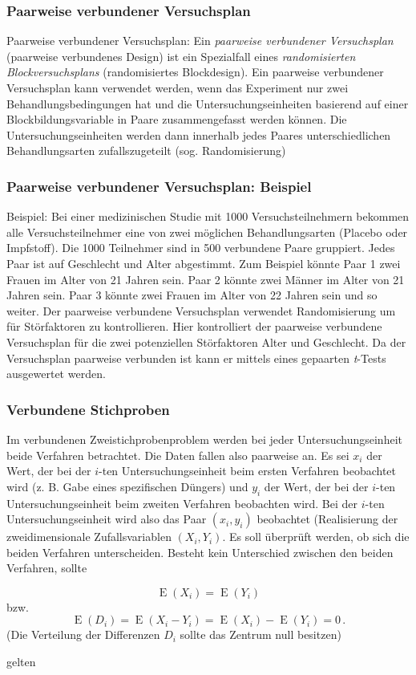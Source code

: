 \documentclass{beamer}
\begin{document}
\begin{frame}
\frametitle{Paarweise verbundener Versuchsplan}

\begin{exampleblock}{Paarweise verbundener Versuchsplan:}
Ein \textit{paarweise verbundener Versuchsplan} (paarweise verbundenes Design) ist ein Spezialfall eines \textit{randomisierten Blockversuchsplans} (randomisiertes Blockdesign). Ein paarweise verbundener Versuchsplan kann verwendet werden, wenn das Experiment nur zwei Behandlungsbedingungen hat und die Untersuchungseinheiten basierend auf einer Blockbildungsvariable in Paare zusammengefasst werden können. Die Untersuchungseinheiten werden dann innerhalb jedes Paares unterschiedlichen Behandlungsarten zufallszugeteilt (sog. Randomisierung)
\end{exampleblock}
\end{frame}

\begin{frame}
\frametitle{Paarweise verbundener Versuchsplan: Beispiel}
\begin{exampleblock}{Beispiel:}
Bei einer medizinischen Studie mit 1000 Versuchsteilnehmern bekommen alle Versuchsteilnehmer eine von zwei möglichen Behandlungsarten (Placebo oder Impfstoff). Die 1000 Teilnehmer sind in 500 verbundene Paare gruppiert. Jedes Paar ist auf Geschlecht und Alter abgestimmt. Zum Beispiel könnte Paar 1 zwei Frauen im Alter von 21 Jahren sein. Paar 2 könnte zwei Männer im Alter von 21 Jahren sein. Paar 3 könnte zwei Frauen im Alter von 22 Jahren sein und so weiter. Der paarweise verbundene Versuchsplan verwendet Randomisierung um für Störfaktoren zu kontrollieren. Hier kontrolliert der paarweise verbundene Versuchsplan für die zwei potenziellen Störfaktoren Alter und Geschlecht. Da der Versuchsplan paarweise verbunden ist kann er mittels eines gepaarten \textit{t}-Tests ausgewertet werden.
\end{exampleblock}
\end{frame}

\begin{frame}
\frametitle{Verbundene Stichproben}
Im verbundenen Zweistichprobenproblem werden bei jeder Untersuchungseinheit beide Verfahren betrachtet. Die Daten fallen also paarweise an. Es sei $x_{i}$ der Wert, der bei der $i$-ten Untersuchungseinheit beim ersten Verfahren beobachtet wird (z. B. Gabe eines spezifischen Düngers) und $y_{i}$ der Wert, der bei der $i$-ten Untersuchungseinheit beim zweiten Verfahren beobachten wird. Bei der $i$-ten Untersuchungseinheit wird also das Paar $(x_{i},y_{i})$ beobachtet (Realisierung der zweidimensionale Zufallsvariablen $(X_{i},Y_{i})$. Es soll überprüft werden, ob sich die beiden Verfahren unterscheiden. Besteht kein Unterschied zwischen den beiden Verfahren, sollte

 \[\operatorname{E}(X_{i}) = \operatorname{E}(Y_{i})\] bzw.  \[\operatorname{E}(D_{i}) =  \operatorname{E}(X_{i} - Y_{i}) = \operatorname{E}(X_{i}) -\operatorname{E}(Y_{i}) = 0\,.\] (Die Verteilung der Differenzen $D_{i}$ sollte das Zentrum null besitzen)
 
gelten

\end{frame}
\end{document}
